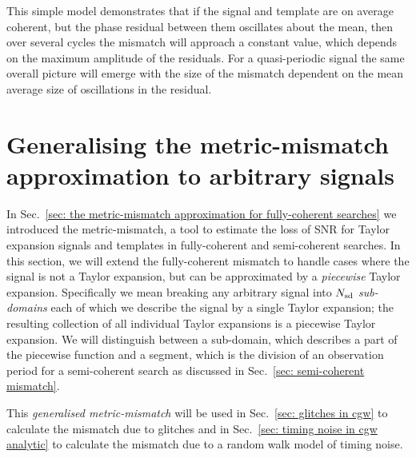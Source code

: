 \documentclass[../full_thesis/full_thesis.tex]{subfiles}
\begin{document}
This simple model demonstrates that if the signal and template are on average
coherent, but the phase residual between them oscillates about the mean, then
over several cycles the mismatch will approach a constant value, which depends on
the maximum amplitude of the residuals.  For a quasi-periodic signal the same
overall picture will emerge with the size of the mismatch dependent on the mean
average size of oscillations in the residual.

\section{Generalising the metric-mismatch approximation to arbitrary signals}
\label{sec: generalising the metric-mismatch}
In Sec.~\ref{sec: the metric-mismatch approximation for fully-coherent searches}
we introduced the metric-mismatch, a tool to estimate
the loss of SNR for Taylor expansion signals and templates in fully-coherent
and semi-coherent searches. In this section, we will extend the fully-coherent
mismatch to handle cases where the signal is not a Taylor expansion, but can
be approximated by a \emph{piecewise} Taylor expansion. Specifically we mean
breaking any arbitrary signal into $N_{\textrm{sd}}$ \emph{sub-domains} each of which we
describe the signal by a single Taylor expansion; the resulting collection of
all individual Taylor expansions is a piecewise Taylor expansion. We will
distinguish between a sub-domain, which describes a part of the piecewise
function and a segment, which is the division of an observation period for a
semi-coherent search as discussed in Sec.~\ref{sec: semi-coherent mismatch}. 

This \emph{generalised metric-mismatch} will be used in Sec.~\ref{sec: glitches
in cgw} to calculate the mismatch due to glitches and in Sec.~\ref{sec: timing
noise in cgw analytic} to calculate the mismatch due to a random walk model of
timing noise.


\end{document}
